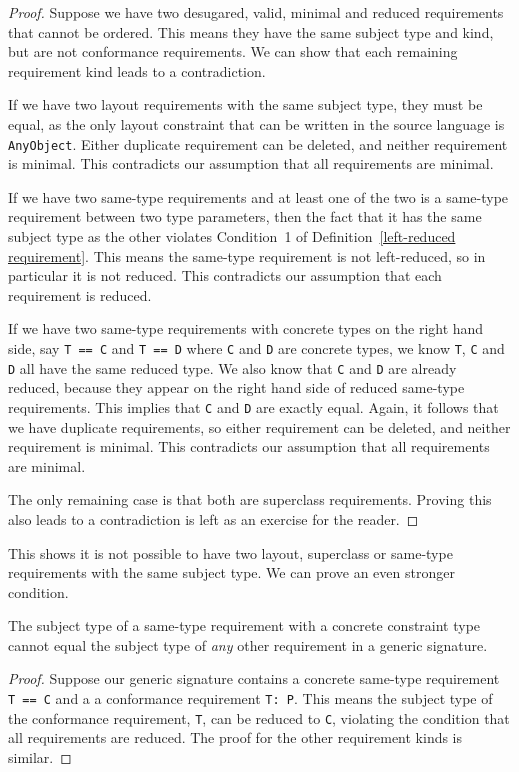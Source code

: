 \documentclass[../generics]{subfiles}
\begin{document}
\begin{proof}
Suppose we have two desugared, valid, minimal and reduced requirements that cannot be ordered. This means they have the same subject type and kind, but are not conformance requirements. We can show that each remaining requirement kind leads to a contradiction.

If we have two layout requirements with the same subject type, they must be equal, as the only layout constraint that can be written in the source language is \texttt{AnyObject}. Either duplicate requirement can be deleted, and neither requirement is minimal. This contradicts our assumption that all requirements are minimal.

If we have two same-type requirements and at least one of the two is a same-type requirement between two type parameters, then the fact that it has the same subject type as the other violates Condition~1 of Definition~\ref{left-reduced requirement}. This means the same-type requirement is not left-reduced, so in particular it is not reduced. This contradicts our assumption that each requirement is reduced.

If we have two same-type requirements with concrete types on the right hand side, say \texttt{T == C} and \texttt{T == D} where \texttt{C} and \texttt{D} are concrete types, we know \texttt{T}, \texttt{C} and \texttt{D} all have the same reduced type. We also know that \texttt{C} and \texttt{D} are already reduced, because they appear on the right hand side of reduced same-type requirements. This implies that \texttt{C} and \texttt{D} are exactly equal. Again, it follows that we have duplicate requirements, so either requirement can be deleted, and neither requirement is minimal. This contradicts our assumption that all requirements are minimal.

The only remaining case is that both are superclass requirements. Proving this also leads to a contradiction is left as an exercise for the reader.
\end{proof}
This shows it is not possible to have two layout, superclass or same-type requirements with the same subject type. We can prove an even stronger condition.
\begin{proposition}
The subject type of a same-type requirement with a concrete constraint type cannot equal the subject type of \emph{any} other requirement in a generic signature.
\end{proposition}
\begin{proof}
Suppose our generic signature contains a concrete same-type requirement \texttt{T~==~C} and a a conformance requirement \texttt{T:~P}. This means the subject type of the conformance requirement, \texttt{T}, can be reduced to \texttt{C}, violating the condition that all requirements are reduced. The proof for the other requirement kinds is similar.
\end{proof}
\end{document}
